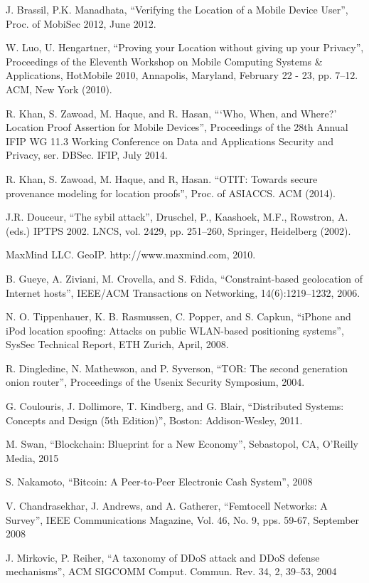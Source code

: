 \documentclass[12pt]{report}
\begin{document}
\newpage
\begin{thebibliography}{9}

  J. Brassil, P.K. Manadhata,
  ``Verifying the Location of a Mobile Device User'',
  Proc. of MobiSec 2012,
  June 2012.

  W. Luo, U. Hengartner,
  ``Proving your Location without giving up your Privacy'',
  Proceedings of the Eleventh Workshop on Mobile Computing Systems \& Applications,
  HotMobile 2010, Annapolis, Maryland, February 22 - 23, pp. 7–12. ACM,
  New York (2010).

  R. Khan, S. Zawoad, M. Haque, and R. Hasan,
  ```Who, When, and Where?' Location Proof Assertion for Mobile Devices'',
  Proceedings of the 28th Annual IFIP WG 11.3 Working Conference on Data and Applications Security and Privacy, ser. DBSec. IFIP,
  July 2014.
 
  R. Khan, S. Zawoad, M. Haque, and R, Hasan.
  ``OTIT: Towards secure provenance modeling for location proofs'',
  Proc. of ASIACCS. ACM (2014).

  J.R. Douceur,
  ``The sybil attack'',
  Druschel, P., Kaashoek, M.F., Rowstron, A. (eds.) IPTPS 2002. LNCS, vol. 2429, pp. 251–260,
  Springer, Heidelberg (2002).

  MaxMind LLC. GeoIP. http://www.maxmind.com,
  2010.

  B. Gueye, A. Ziviani, M. Crovella, and S. Fdida,
  ``Constraint-based geolocation of Internet hosts'',
  IEEE/ACM Transactions on Networking,
  14(6):1219–1232, 2006.

  N. O. Tippenhauer, K. B. Rasmussen, C. Popper, and S. Capkun,
  ``iPhone and iPod location spoofing: Attacks on public WLAN-based positioning systems'',
  SysSec Technical Report,
  ETH Zurich, April, 2008.

  R. Dingledine, N. Mathewson, and P. Syverson,
  ``TOR: The second generation onion router'',
  Proceedings of the Usenix Security Symposium,
  2004.

  G. Coulouris, J. Dollimore, T. Kindberg, and G. Blair,
  ``Distributed Systems: Concepts and Design (5th Edition)'',
  Boston: Addison-Wesley,
  2011.

  M. Swan,
  ``Blockchain: Blueprint for a New Economy'',
  Sebastopol, CA,
  O’Reilly Media, 2015

  S. Nakamoto,
  ``Bitcoin: A Peer-to-Peer Electronic Cash System'',
  2008
  
  V. Chandrasekhar, J. Andrews, and A. Gatherer,
  ``Femtocell Networks: A Survey'',
  IEEE Communications Magazine, Vol. 46, No. 9, pps. 59-67,
  September 2008
  
  J. Mirkovic, P. Reiher,
  ``A taxonomy of DDoS attack and DDoS defense mechanisms'',
  ACM SIGCOMM Comput. Commun. Rev. 34, 2, 39–53,
  2004

\end{thebibliography}
\end{document}
